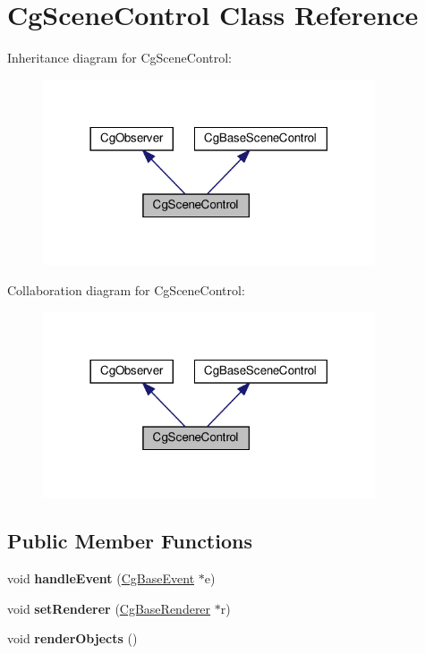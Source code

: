 \hypertarget{class_cg_scene_control}{}\section{Cg\+Scene\+Control Class Reference}
\label{class_cg_scene_control}


Inheritance diagram for Cg\+Scene\+Control\+:
\nopagebreak
\begin{figure}[H]
\begin{center}
\leavevmode
\includegraphics[width=278pt]{class_cg_scene_control__inherit__graph}
\end{center}
\end{figure}


Collaboration diagram for Cg\+Scene\+Control\+:
\nopagebreak
\begin{figure}[H]
\begin{center}
\leavevmode
\includegraphics[width=278pt]{class_cg_scene_control__coll__graph}
\end{center}
\end{figure}
\subsection*{Public Member Functions}
\begin{DoxyCompactItemize}
\item 
\mbox{\label{class_cg_scene_control_a8cff0bd3d67f5618d6b1e78faa558bc6}} 
void {\bfseries handle\+Event} (\hyperlink{class_cg_base_event}{Cg\+Base\+Event} $\ast$e)
\item 
\mbox{\label{class_cg_scene_control_aaed0ae02e286b1d66c3b9597b020dd39}} 
void {\bfseries set\+Renderer} (\hyperlink{class_cg_base_renderer}{Cg\+Base\+Renderer} $\ast$r)
\item 
\mbox{\label{class_cg_scene_control_a4b8196ea25a0583aa08caeb9de9d1cd5}} 
void {\bfseries render\+Objects} ()
\end{DoxyCompactItemize}


